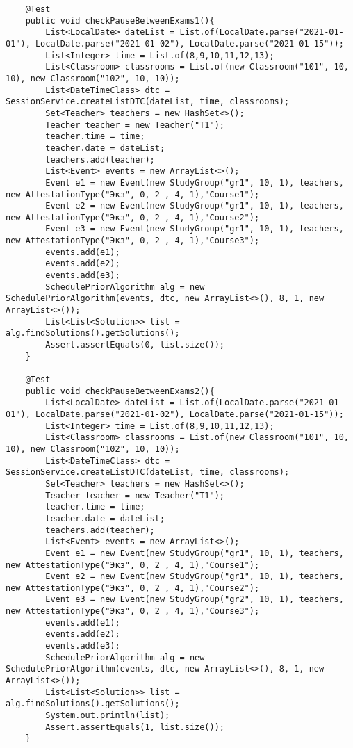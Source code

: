 \begin{lstlisting}
	@Test
	public void checkPauseBetweenExams1(){
		List<LocalDate> dateList = List.of(LocalDate.parse("2021-01-01"), LocalDate.parse("2021-01-02"), LocalDate.parse("2021-01-15"));
		List<Integer> time = List.of(8,9,10,11,12,13);
		List<Classroom> classrooms = List.of(new Classroom("101", 10, 10), new Classroom("102", 10, 10));
		List<DateTimeClass> dtc = SessionService.createListDTC(dateList, time, classrooms);
		Set<Teacher> teachers = new HashSet<>();
		Teacher teacher = new Teacher("T1");
		teacher.time = time;
		teacher.date = dateList;
		teachers.add(teacher);
		List<Event> events = new ArrayList<>();
		Event e1 = new Event(new StudyGroup("gr1", 10, 1), teachers, new AttestationType("Экз", 0, 2 , 4, 1),"Course1");
		Event e2 = new Event(new StudyGroup("gr1", 10, 1), teachers, new AttestationType("Экз", 0, 2 , 4, 1),"Course2");
		Event e3 = new Event(new StudyGroup("gr1", 10, 1), teachers, new AttestationType("Экз", 0, 2 , 4, 1),"Course3");
		events.add(e1);
		events.add(e2);
		events.add(e3);
		SchedulePriorAlgorithm alg = new SchedulePriorAlgorithm(events, dtc, new ArrayList<>(), 8, 1, new ArrayList<>());
		List<List<Solution>> list = alg.findSolutions().getSolutions();
		Assert.assertEquals(0, list.size());
	}
	
	@Test
	public void checkPauseBetweenExams2(){
		List<LocalDate> dateList = List.of(LocalDate.parse("2021-01-01"), LocalDate.parse("2021-01-02"), LocalDate.parse("2021-01-15"));
		List<Integer> time = List.of(8,9,10,11,12,13);
		List<Classroom> classrooms = List.of(new Classroom("101", 10, 10), new Classroom("102", 10, 10));
		List<DateTimeClass> dtc = SessionService.createListDTC(dateList, time, classrooms);
		Set<Teacher> teachers = new HashSet<>();
		Teacher teacher = new Teacher("T1");
		teacher.time = time;
		teacher.date = dateList;
		teachers.add(teacher);
		List<Event> events = new ArrayList<>();
		Event e1 = new Event(new StudyGroup("gr1", 10, 1), teachers, new AttestationType("Экз", 0, 2 , 4, 1),"Course1");
		Event e2 = new Event(new StudyGroup("gr1", 10, 1), teachers, new AttestationType("Экз", 0, 2 , 4, 1),"Course2");
		Event e3 = new Event(new StudyGroup("gr2", 10, 1), teachers, new AttestationType("Экз", 0, 2 , 4, 1),"Course3");
		events.add(e1);
		events.add(e2);
		events.add(e3);
		SchedulePriorAlgorithm alg = new SchedulePriorAlgorithm(events, dtc, new ArrayList<>(), 8, 1, new ArrayList<>());
		List<List<Solution>> list = alg.findSolutions().getSolutions();
		System.out.println(list);
		Assert.assertEquals(1, list.size());
	}
	

\end{lstlisting}
